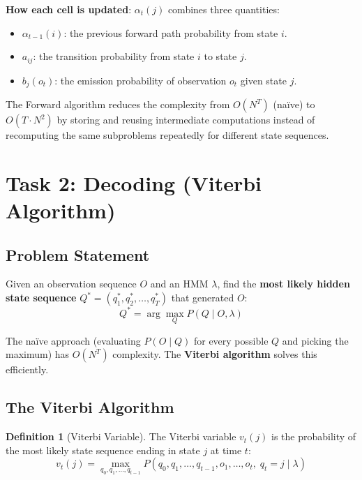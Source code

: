 \documentclass[11pt,a4paper]{article}
\theoremstyle{definition}
\newtheorem{definition}{Definition}[section]
\theoremstyle{plain}
\theoremstyle{remark}
\begin{document}
\textbf{How each cell is updated}: $\alpha_t(j)$ combines three quantities:
\begin{itemize}
    \item $\alpha_{t-1}(i)$: the previous forward path probability from state $i$.
    \item $a_{ij}$: the transition probability from state $i$ to state $j$.
    \item $b_j(o_t)$: the emission probability of observation $o_t$ given state $j$.
\end{itemize}

\begin{tcolorbox}[colback=yellow!10!white,colframe=orange!75!black,title=\textbf{Complexity Reduction}]
The Forward algorithm reduces the complexity from $O(N^T)$ (na\"ive) to $O(T \cdot N^2)$ by storing and reusing intermediate computations instead of recomputing the same subproblems repeatedly for different state sequences.
\end{tcolorbox}

\section{Task 2: Decoding (Viterbi Algorithm)}

\subsection{Problem Statement}

Given an observation sequence $O$ and an HMM $\lambda$, find the \textbf{most likely hidden state sequence} $Q^* = (q_1^*, q_2^*, \dots, q_T^*)$ that generated $O$:
\[
Q^* = \arg\max_{Q} P(Q \mid O, \lambda)
\]

The na\"ive approach (evaluating $P(O \mid Q)$ for every possible $Q$ and picking the maximum) has $O(N^T)$ complexity. The \textbf{Viterbi algorithm} solves this efficiently.

\subsection{The Viterbi Algorithm}

\begin{definition}[Viterbi Variable]
The Viterbi variable $v_t(j)$ is the probability of the most likely state sequence ending in state $j$ at time $t$:
\[
v_t(j) = \max_{q_0, q_1, \dots, q_{t-1}} P(q_0, q_1, \dots, q_{t-1}, o_1, \dots, o_t, \; q_t = j \mid \lambda)
\]
\end{definition}
\end{document}
